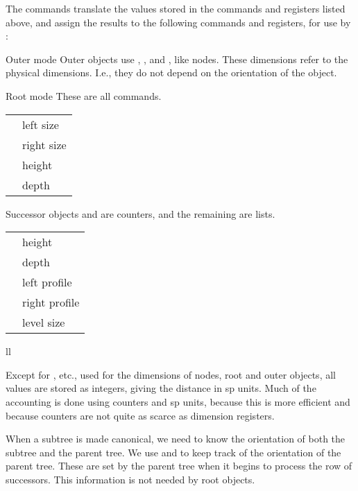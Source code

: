 \documentclass[11pt,english,BCOR10mm,DIV12,bibliography=totoc,parskip=false,smallheadings
    headexclude,footexclude,oneside]{pst-doc}
\begin{document}
The  commands translate the values stored in the commands and 
registers listed above, and assign the results to the following commands and registers, for use 
by :
\begin{compactdesc}
\item[Outer mode]
 Outer objects use , ,  and , like nodes. These dimensions 
 refer to the physical dimensions. I.e., they do not depend on the orientation of the object.

\item[Root mode]
These are all commands.
\begin{tabular}{ll}
 \Ldim{psroot@leftsize} & left size\\
 \Ldim{psroot@rightsize} & right size\\
 \Ldim{psroot@height} & height\\
 \Ldim{psroot@depth} & depth
\end{tabular}

\item[Successor objects]
 and  are counters, and the remaining are lists.
\begin{center}
\begin{tabular}{ll}
 \Ldim{ptr@height}        & height\\
 \Ldim{ptr@depth}         & depth\\
 \Lcs{ptr@leftprofile}   & left profile\\
 \Lcs{ptr@rightprofile}  & right profile\\
 \Lcs{ptr@levelsizes}    & level size
\end{tabular}{ll}
\end{center}

\end{compactdesc}

Except for , etc., used for the dimensions of nodes, root and outer objects, all values are stored 
as integers, giving the distance in sp units. Much of the accounting is done using counters and sp units, 
because this is more efficient and because counters are not quite as scarce as dimension registers.

When a subtree is made canonical, we need to know the orientation of both the subtree and the parent tree. 
We use  and  to keep track of the orientation of the parent tree. These are set 
by the parent tree when it begins to process the row of successors. This information is not needed by root objects.
\end{document}
